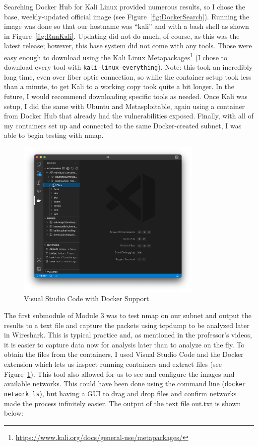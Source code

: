 \documentclass[12pt]{article}
\begin{document}
Searching Docker Hub for Kali Linux provided numerous results, so I chose the base, weekly-updated official image (see Figure~\ref{fig:DockerSearch}). Running the image was done so that our hostname was ``kali'' and with a bash shell as shown in Figure~\ref{fig:RunKali}. Updating did not do much, of course, as this was the latest release; however, this base system did not come with any tools. Those were easy enough to download using the Kali Linux Metapackages\footnote{\href{https://www.kali.org/docs/general-use/metapackages/}{https://www.kali.org/docs/general-use/metapackages/}} (I chose to download every tool with \texttt{kali-linux-everything}). Note: this took an incredibly long time, even over fiber optic connection, so while the container setup took less than a minute, to get Kali to a working copy took quite a bit longer. In the future, I would recommend downloading specific tools as needed. Once Kali was setup, I did the same with Ubuntu and Metasploitable, again using a container from Docker Hub that already had the vulnerabilities exposed. Finally, with all of my containers set up and connected to the same Docker-created subnet, I was able to begin testing with nmap.

\begin{figure}[!ht]
    \centering
    \includegraphics[width=0.8\textwidth]{figure04.png}\vspace{-1em}
    \caption{Visual Studio Code with Docker Support.}
    \label{fig:VSCode}
\end{figure}

The first submodule of Module 3 was to test nmap on our subnet and output the results to a text file and capture the packets using tcpdump to be analyzed later in Wireshark. This is typical practice and, as mentioned in the professor's videos, it is easier to capture data now for analysis later than to analyze on the fly. To obtain the files from the containers, I used Visual Studio Code and the Docker extension which lets us inspect running containers and extract files (see Figure~\ref{fig:VSCode}). This tool also allowed for us to see and configure the images and available networks. This could have been done using the command line (\texttt{docker network ls}), but having a GUI to drag and drop files and confirm networks made the process infinitely easier. The output of the text file out.txt is shown below:
\end{document}
